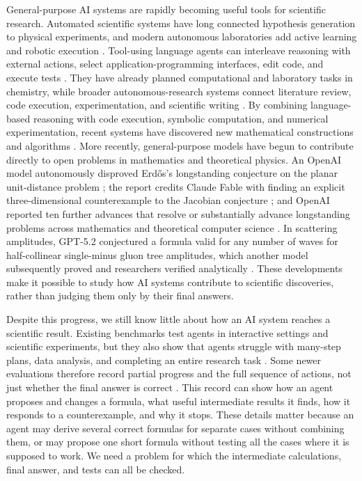 \documentclass{article}
\begin{document}
General-purpose AI systems are rapidly becoming useful tools for scientific
research. Automated scientific systems have long connected hypothesis
generation to physical experiments, and modern autonomous laboratories add
active learning and robotic execution
\citep{King2004RobotScientist,King2009AutomationScience,Burger2020MobileChemist,
Szymanski2023ALab}. Tool-using language agents can interleave reasoning with
external actions, select application-programming interfaces, edit code, and
execute tests
\citep{Yao2022ReAct,Schick2023Toolformer,Patil2023Gorilla,Yang2024SWEAgent}.
They have already planned computational and laboratory tasks in chemistry,
while broader autonomous-research systems connect literature review, code
execution, experimentation, and scientific writing
\citep{Bran2024ChemCrow,Boiko2023AutonomousResearch,Lu2024AIScientist,
Schmidgall2025AgentLaboratory,VillaescusaNavarro2025Denario}. By combining
language-based reasoning with code execution, symbolic computation, and
numerical experimentation, recent systems have discovered new mathematical
constructions and algorithms \citep{funsearch,alphaevolve,Wang2025AutomatedAD}.
More recently, general-purpose models have begun to contribute directly to
open problems in mathematics and theoretical physics. An OpenAI model
autonomously disproved Erdős's longstanding conjecture on the planar
unit-distance problem \citep{openai2026unitdistance}; the report credits Claude
Fable with finding an explicit three-dimensional counterexample to the Jacobian conjecture
\citep{ramos2026jacobian}; and OpenAI reported ten further advances that
resolve or substantially advance longstanding problems across mathematics and
theoretical computer science \citep{openai2026tenadvances}. In scattering
amplitudes, GPT-5.2 conjectured a formula valid for any number of waves for half-collinear
single-minus gluon tree amplitudes, which another model subsequently proved
and researchers verified analytically \citep{guevara2026singleminus}. These
developments make it possible to study how AI systems contribute to scientific
discoveries, rather than judging them only by their final answers.

Despite this progress, we still know little about how an AI system reaches a
scientific result. Existing benchmarks test agents in interactive settings and
scientific experiments, but they also show that agents struggle with
many-step plans, data analysis, and completing an entire research task
\citep{Liu2023AgentBench,Huang2023MLAgentBench,Chen2024ScienceAgentBench,
Gu2024BLADE}. Some newer evaluations therefore record partial progress and the
full sequence of actions, not just whether the final answer is correct
\citep{Ma2024AgentBoard,Lu2025AgentRewardBench}. This record can show how an
agent proposes and changes a formula, what useful intermediate results it
finds, how it responds to a counterexample, and why it stops. These details
matter because an agent may derive several correct formulas for separate cases
without combining them, or may propose one short formula without testing all
the cases where it is supposed to work. We need a problem for which the
intermediate calculations, final answer, and tests can all be checked.
\end{document}
